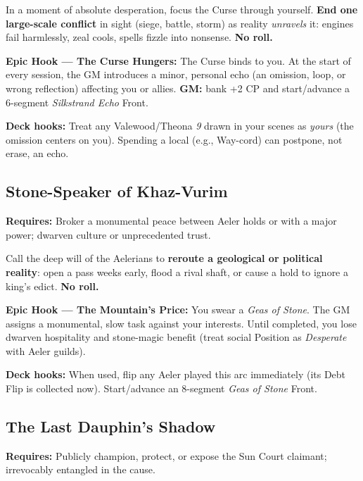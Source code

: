 \begin{tcolorbox}[enhanced,sharp corners,boxrule=.6pt,title={Talent — Laughter That Ends Sieges (20 XP, 1/campaign)}]
In a moment of absolute desperation, focus the Curse through yourself. \textbf{End one large-scale conflict} in sight (siege, battle, storm) as reality \emph{unravels} it: engines fail harmlessly, zeal cools, spells fizzle into nonsense. \textbf{No roll.}
\end{tcolorbox}

\textbf{Epic Hook — The Curse Hungers:} The Curse binds to you. At the start of every session, the GM introduces a minor, personal echo (an omission, loop, or wrong reflection) affecting you or allies. \textbf{GM:} bank +2 CP and start/advance a 6-segment \emph{Silkstrand Echo} Front.

\textbf{Deck hooks:} Treat any Valewood/Theona \emph{9} drawn in your scenes as \emph{yours} (the omission centers on you). Spending a local \SuitDiamond{} (e.g., Way-cord) can postpone, not erase, an echo.

\subsection{Stone-Speaker of Khaz-Vurim}
\textbf{Requires:} Broker a monumental peace between Aeler holds or with a major power; dwarven culture or unprecedented trust.

\begin{tcolorbox}[enhanced,sharp corners,boxrule=.6pt,title={Talent — Move the Mountain's Will (20 XP, 1/campaign)}]
Call the deep will of the Aelerians to \textbf{reroute a geological or political reality}: open a pass weeks early, flood a rival shaft, or cause a hold to ignore a king’s edict. \textbf{No roll.}
\end{tcolorbox}

\textbf{Epic Hook — The Mountain’s Price:} You swear a \emph{Geas of Stone}. The GM assigns a monumental, slow task against your interests. Until completed, you lose dwarven hospitality and stone-magic benefit (treat social Position as \emph{Desperate} with Aeler guilds).

\textbf{Deck hooks:} When used, flip any Aeler \SuitDiamond{} played this arc immediately (its Debt Flip is collected now). Start/advance an 8-segment \emph{Geas of Stone} Front.

\subsection{The Last Dauphin’s Shadow}
\textbf{Requires:} Publicly champion, protect, or expose the Sun Court claimant; irrevocably entangled in the cause.

